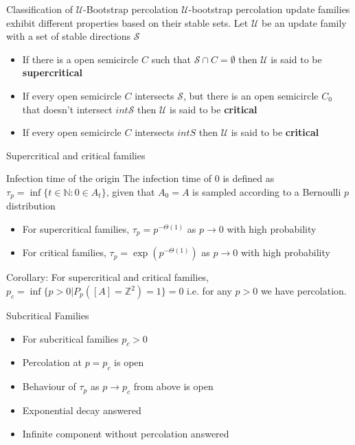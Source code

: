 \documentclass{beamer}
\begin{document}
\begin{frame}{Classification of $\mathscr{U}$-Bootstrap percolation}
$\mathscr{U}$-bootstrap percolation update families exhibit different properties based on their stable sets. Let $\mathscr{U}$ be an update family with a set of stable directions $\mathscr{S}$
\begin{block}

\begin{itemize}
    \item If there is a open semicircle $C$ such that $\mathscr{S}\cap C=\emptyset$ then $\mathscr{U}$ is said to be \textbf{supercritical}
    \item If every open semicircle $C$ intersects $\mathscr{S}$, but there is an open semicircle $C_0$ that doesn't intersect $int\mathscr{S}$ then $\mathscr{U}$ is said to be \textbf{critical}
    \item If every open semicircle $C$ intersects $int S$ then $\mathscr{U}$ is said to be \textbf{critical}
\end{itemize}

\end{block}

\end{frame}

\begin{frame}{Supercritical and critical families}
\begin{block}{Infection time of the origin}
The infection time of 0 is defined as $\tau_p=\inf\{t\in\mathbb{N}: 0 \in A_t\}$, given that $A_0=A$ is sampled according to a Bernoulli $p$ distribution
\end{block}

\begin{itemize}
    \item For supercritical families, $\tau_p=p^{-\Theta(1)}$ as $p\rightarrow 0$ with high probability
    \item For critical families, $\tau_p=\exp(p^{-\Theta(1)})$ as 
    $p\rightarrow 0$ with high probability
\end{itemize}

Corollary: For supercritical and critical families, $p_c=\inf\{p>0|P_p([A]=\mathbb{Z}^2)=1\}=0$ i.e. for any $p>0$ we have percolation.

    
\end{frame}


\begin{frame}{Subcritical Families}

\begin{itemize}
    \item For subcritical families $p_c>0$
    \item Percolation at $p=p_c$ is open
    \item Behaviour of $\tau_p$ as $p\rightarrow p_c$ from above is open
    \item Exponential decay answered 
    \item Infinite component without percolation answered
\end{itemize}

    
\end{frame}
\end{document}
